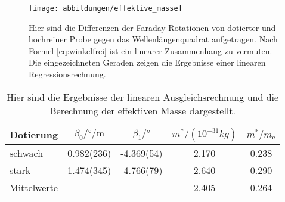 \begin{figure}
  \centering
  \texttt{[image: abbildungen/effektive\_masse]}
  \caption{Hier sind die Differenzen der Faraday-Rotationen von
    dotierter und hochreiner Probe gegen das Wellenlängenquadrat
    aufgetragen.  Nach Formel \eqref{eq:winkelfrei} ist ein linearer
    Zusammenhang zu vermuten.  Die eingezeichneten Geraden zeigen die
    Ergebnisse einer linearen Regressionsrechnung.}
  \label{fig:linregress}
\end{figure}

\begin{table}
  \centering
  \begin{tabular}{lSSSS}
    \toprule
    {Dotierung} &
    {$\beta_0/\si{\degree\per\meter}$} &
    {$\beta_1/\si{\degree}$} &
    {$m^*/(10^{-31}\si{kg})$} &
    {$m^*/m_\text{e}$}
    \\
    \midrule
    schwach & 0.982(236) & -4.369(54) & 2.170 & 0.238 \\
    stark & 1.474(345) & -4.766(79) & 2.640 & 0.290 \\
    \midrule
    Mittelwerte & & & 2.405 & 0.264\\
    \bottomrule
  \end{tabular}
  \caption{Hier sind die Ergebnisse der linearen Ausgleichsrechnung und
    die Berechnung der effektiven Masse dargestellt.}
  \label{tab:linregress}
\end{table}
